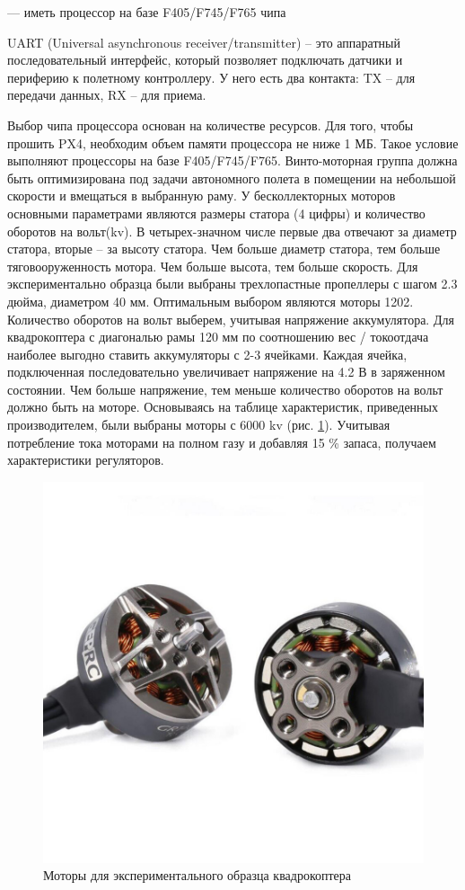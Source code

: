 --- иметь процессор на базе F405/F745/F765 чипа

UART (Universal asynchronous receiver/transmitter) -- это аппаратный последовательный интерфейс, который позволяет подключать датчики и периферию к полетному контроллеру. У него есть два контакта: TX -- для передачи данных, RX -- для приема.

Выбор чипа процессора основан на количестве ресурсов. Для того, чтобы прошить PX4, необходим объем памяти процессора не ниже 1 МБ. Такое условие выполняют процессоры на базе F405/F745/F765.
Винто-моторная группа должна быть оптимизирована под задачи автономного полета в помещении на небольшой скорости и вмещаться в выбранную раму. У бесколлекторных моторов основными параметрами являются размеры статора (4 цифры) и количество оборотов на вольт(kv). В четырех-значном числе первые два отвечают за диаметр статора, вторые -- за высоту статора. Чем больше диаметр статора, тем больше тяговооруженность мотора. Чем больше высота, тем больше скорость. Для экспериментально образца были выбраны трехлопастные пропеллеры с шагом 2.3 дюйма, диаметром 40 мм. Оптимальным выбором являются моторы 1202. Количество оборотов на вольт выберем, учитывая напряжение аккумулятора.
Для квадрокоптера с диагональю рамы 120 мм по соотношению вес / токоотдача наиболее выгодно ставить аккумуляторы с 2-3 ячейками. Каждая ячейка, подключенная последовательно увеличивает напряжение на 4.2 В в заряженном состоянии. Чем больше напряжение, тем меньше количество оборотов на вольт должно быть на моторе. Основываясь на таблице характеристик, приведенных производителем, были выбраны моторы с 6000 kv (рис. \ref{fig:motor}).
Учитывая потребление тока моторами на полном газу и добавляя 15 \% запаса, получаем характеристики регуляторов.
\begin{figure}[H]
	\centering
	\includegraphics[width=0.5\linewidth]{pics/motor}
	\caption{Моторы для экспериментального образца квадрокоптера
	}
	\label{fig:motor} %
\end{figure}
